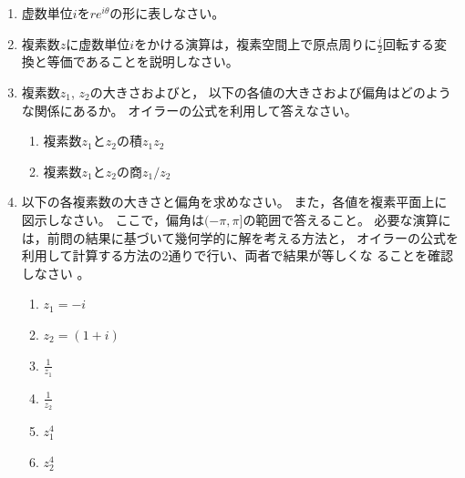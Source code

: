 \documentclass[twocolumn,11pt]{jarticle}
\begin{document}
\begin{enumerate}
\item 虚数単位$i$を$re^{i\theta}$の形に表しなさい。
\item 複素数$z$に虚数単位$i$をかける演算は，複素空間上で原点周りに$\frac{i}{2}$回転する変換と等価であることを説明しなさい。
\item 複素数$z_1$, $z_2$の大きさおよびと，
  以下の各値の大きさおよび偏角はどのような関係にあるか。
  オイラーの公式を利用して答えなさい。
  \begin{enumerate}
  \item 複素数$z_1$と$z_2$の積$z_1z_2$
  \item 複素数$z_1$と$z_2$の商$z_1/z_2$
  \end{enumerate}
\item 以下の各複素数の大きさと偏角を求めなさい。
  また，各値を複素平面上に図示しなさい。
  ここで，偏角は$(-\pi,\pi]$の範囲で答えること。
  必要な演算には，前問の結果に基づいて幾何学的に解を考える方法と，
  オイラーの公式を利用して計算する方法の2通りで行い、両者で結果が等しくな
  ることを確認しなさい
  。
  \begin{enumerate}
  \item\label{eitem:z1} $z_1=-i$
  \item\label{eitem:z2} $z_2=(1+i)$
  \item\label{eitem:1/z_1} $\displaystyle\frac{1}{z_1}$
  \item\label{eitem:1/z_2} $\displaystyle\frac{1}{z_2}$
  \item\label{eitem:z_1^4} $z_1^4$
  \item\label{eitem:z_2^4} $z_2^4$

\end{enumerate}
\end{enumerate}
\end{document}
